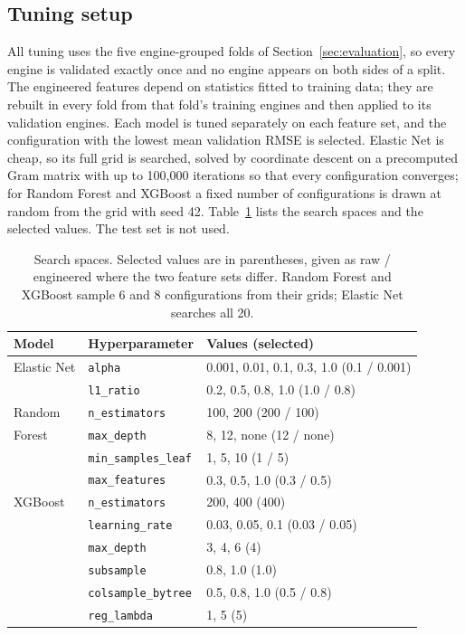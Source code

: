 \subsection{Tuning setup}
All tuning uses the five engine-grouped folds of
Section~\ref{sec:evaluation}, so every engine is validated exactly once and
no engine appears on both sides of a split. The engineered features depend
on statistics fitted to training data; they are rebuilt in every fold from
that fold's training engines and then applied to its validation engines.
Each model is tuned separately on each feature set, and the configuration
with the lowest mean validation RMSE is selected. Elastic Net is cheap, so
its full grid is searched, solved by coordinate descent on a precomputed
Gram matrix with up to 100,000 iterations so that every configuration
converges; for Random Forest and XGBoost a fixed number of
configurations is drawn at random from the grid with seed 42.
Table~\ref{tab:search-space} lists the search spaces and the selected
values. The test set is not used.

\begin{table}[t]
\centering
\caption{Search spaces. Selected values are in parentheses, given as
raw / engineered where the two feature sets differ. Random Forest and
XGBoost sample 6 and 8 configurations from their grids; Elastic Net
searches all 20.}
\label{tab:search-space}
\footnotesize
\begin{tabular}{llp{2.9cm}}
\hline
Model & Hyperparameter & Values (selected) \\
\hline
Elastic Net & \texttt{alpha} & 0.001, 0.01, 0.1, 0.3, 1.0 (0.1 / 0.001) \\
            & \texttt{l1\_ratio} & 0.2, 0.5, 0.8, 1.0 (1.0 / 0.8) \\
\hline
Random      & \texttt{n\_estimators} & 100, 200 (200 / 100) \\
Forest      & \texttt{max\_depth} & 8, 12, none (12 / none) \\
            & \texttt{min\_samples\_leaf} & 1, 5, 10 (1 / 5) \\
            & \texttt{max\_features} & 0.3, 0.5, 1.0 (0.3 / 0.5) \\
\hline
XGBoost     & \texttt{n\_estimators} & 200, 400 (400) \\
            & \texttt{learning\_rate} & 0.03, 0.05, 0.1 (0.03 / 0.05) \\
            & \texttt{max\_depth} & 3, 4, 6 (4) \\
            & \texttt{subsample} & 0.8, 1.0 (1.0) \\
            & \texttt{colsample\_bytree} & 0.5, 0.8, 1.0 (0.5 / 0.8) \\
            & \texttt{reg\_lambda} & 1, 5 (5) \\
\hline
\end{tabular}
\end{table}

